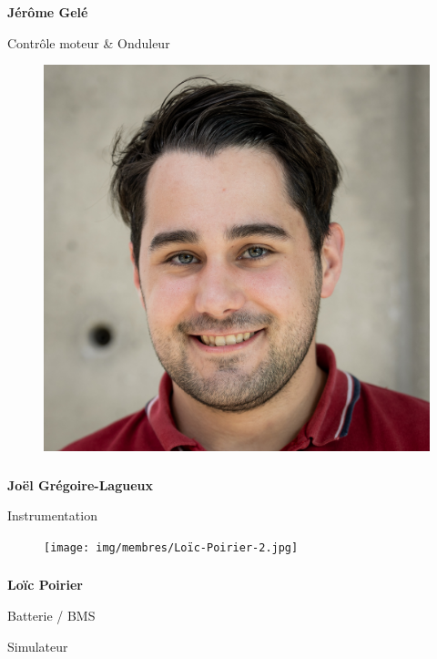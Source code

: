 \documentclass[a0paper,portrait]{baposter}
\begin{document}
\begin{poster}
{\subsubsection*{}
\vspace{2mm}
\textbf{Jérôme Gelé}

Contrôle moteur \& Onduleur

\begin{figure}
\includegraphics[width=.9\linewidth]{img/membres/Joël-Grégoire-Lagueux-1.jpg} 
\end{figure}
\subsubsection*{}
\vspace{2mm}
\textbf{Joël Grégoire-Lagueux}

Instrumentation

\begin{figure}
\texttt{[image: img/membres/Loïc-Poirier-2.jpg]} 
\end{figure}
\subsubsection*{}
\vspace{-2mm}
\textbf{Loïc Poirier}

Batterie / BMS

Simulateur

}
\end{poster}
\end{document}
